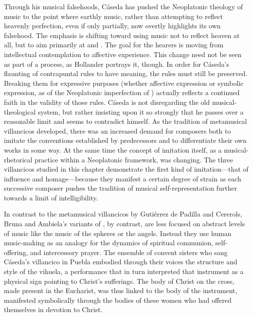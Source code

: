 Through his musical falsehoods, Cáseda has pushed the Neoplatonic theology of
music to the point where earthly music, rather than attempting to reflect
heavenly perfection, even if only partially, now overtly highlights its own
falsehood.
The emphasis is shifting toward using music not to reflect heaven at all, but
to aim primarily at  and .
The goal for the hearers is moving from intellectual contemplation to affective
experience.
This change need not be seen as part of a  process, as
Hollander portrays it, though.
In order for Cáseda's flaunting of contrapuntal rules to have meaning, the
rules must still be preserved.
Breaking them for expressive purposes (whether affective expression or symbolic
expression, as of the Neoplatonic imperfection of ) actually reflects a continued faith in the validity of those
rules.
Cáseda is not disregarding the old musical-theological system, but rather
insisting upon it so strongly that he passes over a reasonable limit and seems
to contradict himself.
As the tradition of metamusical villancicos developed, there was an increased
demand for composers both to imitate the conventions established by
predecessors and to differentiate their own works in some way. 
At the same time the concept of imitation itself, as a musical-rhetorical
practice within a Neoplatonic framework, was changing.
The three villancicos studied in this chapter demonstrate the first kind of
imitation---that of influence and homage---because they manifest a certain
degree of strain as each successive composer pushes the tradition of musical
self-representation further towards a limit of intelligibility.


In contrast to the metamusical villancicos by Gutiérrez de Padilla and
Cererols, Bruna and Ambiela's variants of , by
contrast, are less focused on abstract levels of music like the music of the
spheres or the angels.
Instead they use human music-making as an analogy for the dynamics of spiritual
communion, self-offering, and intercessory prayer.
The ensemble of convent sisters who sang Cáseda's villancico in Puebla embodied
through their voices the structure and style of the vihuela, a performance that
in turn interpreted that instrument as a physical sign pointing to Christ's
sufferings.
The body of Christ on the cross, made present in the Eucharist, was thus linked
to the body of the instrument, manifested symbolically through the bodies of
these women who had offered themselves in devotion to Christ.

